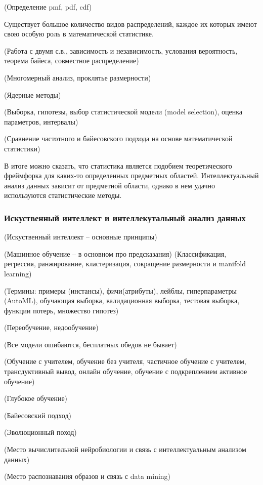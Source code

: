 (Определение pmf, pdf, cdf)

Существует большое количество видов распределений, каждое их которых имеют свою особую роль в математической статистике.

(Работа с двумя с.в., зависимость и независимость, услования вероятность, теорема байеса, совместное распределение)

(Многомерный анализ, проклятье размерности)

(Ядерные методы)

(Выборка, гипотезы, выбор статистической модели (model selection), оценка параметров, интервалы)

(Сравнение частотного и байесовского подхода на основе математической статистики)

В итоге можно сказать, что статистика является подобием теоретического фреймфорка для каких-то определенных предметных областей.
Интеллектуальный анализ данных зависит от предметной области, однако в нем удачно используются статистические методы.


\subsubsection{Искуственный интеллект и интеллекутальный анализ данных}


(Искуственный интеллект -- основные принципы)

(Машинное обучение -- в основном про предсказания)
(Классификация, регрессия, ранжирование, кластеризация, сокращение размерности и manifold learning)

(Термины: примеры (инстансы), фичи(атрибуты), лейблы, гиперпараметры (AutoML), обучающая выборка, валидационная выборка, 
тестовая выборка, функции потерь, множество гипотез)

(Переобучение, недообучение)

(Все модели ошибаются, бесплатных обедов не бывает)

(Обучение с учителем, обучение без учителя, частичное обучение с учителем, трансдуктивный вывод, онлайн обучение, обучение с подкреплением
активное обучение)

(Глубокое обучение)

(Байесовский подход)

(Эволюционный поход)

(Место вычислительной нейробиологии и связь с интеллектуальным анализом данных)

(Место распознавания образов и связь с data mining)



